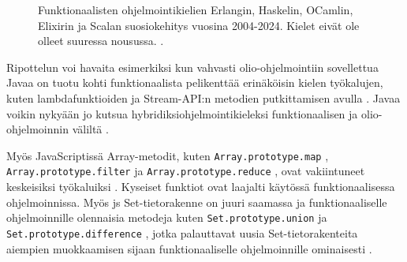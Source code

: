 \begin{figure}[htbp]
    \datatable
    \pgfplotstablegetrowsof{\datatable}
    \centering
    \caption{Funktionaalisten ohjelmointikielien Erlangin, Haskelin, OCamlin, Elixirin ja Scalan suosiokehitys vuosina 2004-2024. Kielet eivät ole olleet suuressa nousussa. \cite{fplanggoogletrend}.}
    \label{fig:fplangpopularity}
\end{figure}


Ripottelun voi havaita esimerkiksi kun vahvasti olio-ohjelmointiin sovellettua Javaa on tuotu kohti funktionaalista pelikenttää erinäköisin kielen työkalujen, kuten lambdafunktioiden ja Stream-API:n metodien putkittamisen avulla \cite{oracle_function_package,oracle_stream_api} .
Javaa voikin nykyään jo kutsua hybridiksiohjelmointikieleksi funktionaalisen ja olio-ohjelmoinnin väliltä \cite[50]{sundstrom_java_fp}.

Myös JavaScriptissä Array-metodit, kuten \texttt{Array.prototype.map} \cite{mdn_array_map}, \texttt{Array.prototype.filter} \cite{mdn_array_filter} ja \texttt{Array.prototype.reduce} \cite{mdn_array_reduce}, ovat vakiintuneet keskeisiksi työkaluiksi \cite{vakil2016,8_must_know_array_methods}. Kyseiset funktiot ovat laajalti käytössä funktionaalisessa ohjelmoinnissa. Myös \gls{js} Set-tietorakenne on juuri saamassa  ja funktionaaliselle ohjelmoinnille olennaisia metodeja kuten \texttt{Set.prototype.union} \cite{mdn_set_union} ja \texttt{Set.prototype.difference} \cite{mdn_set_intersection}, jotka palauttavat uusia Set-tietorakenteita aiempien muokkaamisen sijaan funktionaaliselle ohjelmoinnille ominaisesti \cite{mdn_set_methods}.

